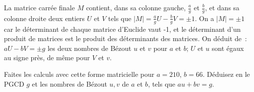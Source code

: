 \documentclass[11pt]{article}
\begin{document}
{La matrice carrée finale $M$  contient, dans sa colonne gauche, $\frac{a}{g}$ et $\frac{b}{g}$,
et dans sa colonne droite deux entiers $U$ et $V$ tels que
$|M|=\frac{a}{g} U - \frac{b}{g} V = \pm 1$. On a $|M|=\pm 1$
car  le déterminant de chaque matrice d'Euclide vaut -1, 
et le déterminant d'un produit de matrices 
est le produit des déterminants des matrices. On  déduit de~: $aU-bV= \pm g$ les deux nombres de Bézout $u$ et $v$ pour $a$ et $b$;
$U$ et $u$ sont égaux au signe près, de même pour $V$ et $v$. 

Faites les calculs avec cette forme matricielle pour $a=210$, $b=66$.
Déduisez en le PGCD $g$ et les nombres de Bézout $u, v$ de $a$ et $b$, tels que
$au+bv=g$.
}
\end{document}
